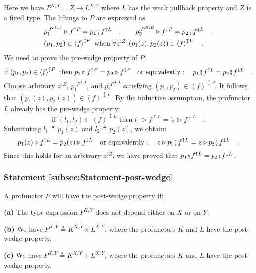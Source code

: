 Here we have $P^{X,Y}=Z\rightarrow L^{X,Y}$ where $L$ has the weak
pullback property and $Z$ is a fixed type. The liftings to $P$ are
expressed as:
\begin{align*}
 & p_{1}^{:P^{A,A}}\triangleright f^{\uparrow P}=p_{1}\bef f^{\uparrow L}\quad,\quad\quad p_{2}^{:P^{B,B}}\triangleright f^{\downarrow P}=p_{2}\bef f^{\downarrow L}\quad,\\
 & (p_{1},p_{2})\in\left<f\right>^{\updownarrow P}\text{ when }\forall z^{:Z}.\,(p_{1}(z),p_{2}(z))\in\left<f\right>^{\updownarrow L}\quad.
\end{align*}
We need to prove the pre-wedge property of $P$:
\[
\text{if }(p_{1},p_{2})\in\left<f\right>^{\updownarrow P}\text{ then }p_{1}\triangleright f^{\uparrow P}=p_{2}\triangleright f^{\downarrow P}\quad\text{or equivalently}:\quad p_{1}\bef f^{\uparrow L}=p_{2}\bef f^{\downarrow L}\quad.
\]
Choose arbitrary $z^{:Z}$, $p_{1}^{:P^{A,A}}$, and $p_{2}^{:P^{A,A}}$
satisfying $(p_{1},p_{2})\in\left<f\right>^{\updownarrow P}$. It
follows that $(p_{1}(z),p_{2}(z))\in\left<f\right>^{\updownarrow L}$.
By the inductive assumption, the profunctor $L$ already has the pre-wedge
property:
\[
\text{if }(l_{1},l_{2})\in\left<f\right>^{\updownarrow L}\text{ then }l_{1}\triangleright f^{\uparrow L}=l_{2}\triangleright f^{\downarrow L}\quad.
\]
Substituting $l_{1}\triangleq p_{1}(z)$ and $l_{2}\triangleq p_{2}(z)$,
we obtain: 
\[
p_{1}(z)\triangleright f^{\uparrow L}=p_{2}(z)\triangleright f^{\downarrow L}\quad\text{or equivalently}:\quad z\triangleright p_{1}\bef f^{\uparrow L}=z\triangleright p_{2}\bef f^{\downarrow L}\quad.
\]
Since this holds for an arbitrary $z^{:Z}$, we have proved that $p_{1}\bef f^{\uparrow L}=p_{2}\bef f^{\downarrow L}$.

\subsubsection{Statement \label{subsec:Statement-post-wedge}\ref{subsec:Statement-post-wedge}}

A profunctor $P$ will have the post-wedge property if:

\textbf{(a)} The type expression $P^{X,Y}$ does not depend either
on $X$ or on $Y$.

\textbf{(b)} We have $P^{X,Y}\triangleq K^{X,Y}\times L^{X,Y}$, where
the profunctors $K$ and $L$ have the post-wedge property.

\textbf{(c)} We have $P^{X,Y}\triangleq K^{X,Y}+L^{X,Y}$, where the
profunctors $K$ and $L$ have the post-wedge property.

